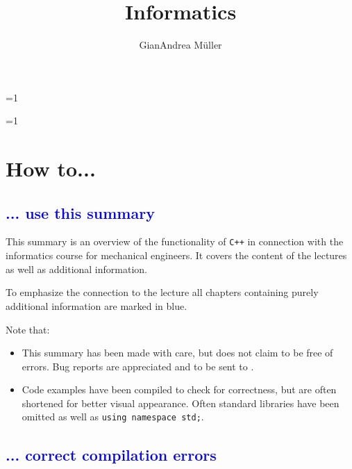 \documentclass[10pt,a4paper]{scrartcl}
\title{Informatics}
\author{GianAndrea Müller}
\gdef\conditionmacro{0}
\begin{document}
\begin{multicols*}{4}
\small
\ifnum\conditionmacro=1
\footnotesize
\fi
\maketitle
\tableofcontents
\normalsize
\end{multicols*}

\begin{multicols*}{2}

\newcommand{\ntn}[1]{\textcolor{blue}{#1}}

\ifnum\conditionmacro=1
\section{How to...}
\label{sec:HowTo}

\subsection{\ntn{... use this summary}}
\label{sec:UseThisSummary}

This summary is an overview of the functionality of \verb.C++. in connection with the informatics course for mechanical engineers. It covers the content of the lectures as well as additional information.

\vspace{3ex}

To emphasize the connection to the lecture all chapters containing purely additional information are marked in blue.

\vspace{3ex}

Note that:
\begin{itemize}
\item This summary has been made with care, but does not claim to be free of errors. Bug reports are appreciated and to be sent to .
\item Code examples have been compiled to check for correctness, but are often shortened for better visual appearance. Often standard libraries have been omitted as well as \verb+using namespace std;+.
\end{itemize}

\subsection{\ntn{... correct compilation errors}}
\label{sec:CorrectCompilationErrors}


\end{multicols*}
\end{document}
